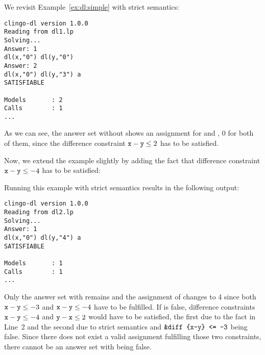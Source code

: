 \begin{example}\label{ex:dl:strict}
We revisit Example~\ref{ex:dl:simple} with strict semantics:
\begin{lstlisting}[numbers=none]
clingo-dl version 1.0.0
Reading from dl1.lp
Solving...
Answer: 1
dl(x,"0") dl(y,"0")
Answer: 2
dl(x,"0") dl(y,"3") a
SATISFIABLE

Models       : 2
Calls        : 1
...
\end{lstlisting}
As we can see, the answer set without  shows an assignment for  and ,
0 for both of them, since the difference constraint $\texttt{x}-\texttt{y}\leq2$ has to be satisfied.

Now, we extend the example slightly by adding the fact that difference constraint $\texttt{x}-\texttt{y}\leq -4$ has to be satisfied:

Running this example with strict semantics results in the following output:
\begin{lstlisting}[numbers=none]
clingo-dl version 1.0.0
Reading from dl2.lp
Solving...
Answer: 1
dl(x,"0") dl(y,"4") a
SATISFIABLE

Models       : 1
Calls        : 1
...
\end{lstlisting}

Only the answer set with  remains and the assignment of  changes to 4 
since both $\texttt{x}-\texttt{y}\leq -3$ and $\texttt{x}-\texttt{y}\leq -4$ have to be fulfilled.
If  is false, difference constraints $\texttt{x}-\texttt{y}\leq -4$ and $\texttt{y}-\texttt{x}\leq 2$ would have to be satisfied,
the first due to the fact in Line~2 and the second due to strict semantics and $\texttt{\&diff\text{ }\{x-y\}\text{ }<=\text{ }-3}$ being false.
Since there does not exist a valid assignment fulfilling those two constraints, there cannot be an answer set with  being false.

\end{example}

